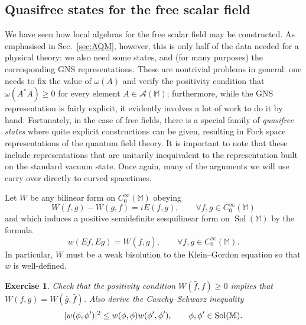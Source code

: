 \documentclass[12pt,a4paper]{article}
\let\Im\relax
\DeclareMathOperator{\Im}{Im}
\newcommand{\1}{\mathds{1}}                         %
\newcommand{\MM}{\mathbb{M}}
\newcommand{\Ac}{{\mathcal{A}}}
\newcommand{\CoinX}[1]{C_0^\infty(#1)}
\newcommand{\ip}[2]{\langle #1|#2\rangle}
\newtheorem{exercise}[theorem]{Exercise}
\DeclareMathOperator{\Sol}{Sol}
\begin{document}
%

\subsection{Quasifree states for the free scalar field}\label{sec:quasifree} 
 
We have seen how local algebras for the free scalar field may be constructed.  
As emphasised in Sec.~\ref{sec:AQM}, however, this is only half of the data needed for
a physical theory: we also need some states, and (for many purposes) the corresponding 
GNS representations. These are nontrivial problems in general: one needs to fix the value of $\omega(A)$ and verify the positivity
condition that $\omega(A^*A)\ge 0$ for every element $A\in\Ac(\MM)$;
furthermore, while the GNS representation is fairly explicit, it evidently involves a lot of work to do it by hand. Fortunately, in the case of free fields, there is a special family of \emph{quasifree states} where quite explicit constructions can be given, resulting in Fock space representations of the quantum field theory. It is important to note that these include representations that are unitarily inequivalent to the representation built on the standard vacuum state. Once again, many of the arguments we will use carry over directly to curved spacetimes. 

Let $W$ be any bilinear form on $\CoinX{\MM}$ obeying
\begin{equation}\label{eq:WE}
W(f,g) - W(g,f) = i E(f,g), \qquad \forall f,g\in\CoinX{\MM}
\end{equation}
and which induces a positive semidefinite sesquilinear form on $\Sol(\MM)$ by the formula 
\[
w(Ef,Eg) = W(\overline{f},g), \qquad \forall f,g\in\CoinX{\MM}.
\]  
In particular, $W$ must be a weak bisolution to the Klein--Gordon equation so that $w$ is well-defined. 
\begin{exercise}
Check that the positivity condition $W(\bar{f},f)\ge 0$ implies that 
$\overline{W(f,g)}=W(\bar{g},\bar{f})$. Also derive the Cauchy--Schwarz inequality
\begin{equation}\label{eq:CSw}
|\Im w(\phi,\phi')|^2 \le w(\phi,\phi)w(\phi',\phi'), \qquad \phi,\phi'\in\Sol(\MM).
\end{equation}
\end{exercise}
\end{document}
